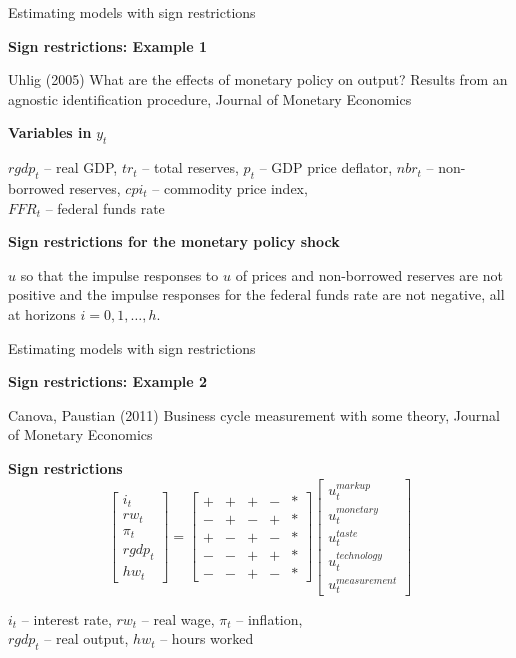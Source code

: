 \documentclass[notes,blackandwhite,mathsans,usenames,dvipsnames]{beamer}
\begin{document}
\begin{frame}{Estimating models with sign restrictions}

\textbf{Sign restrictions: Example 1}

\smallskip\footnotesize Uhlig (2005) {\color{mcxs2}What are the effects of monetary policy on output? Results from an agnostic identification procedure, Journal of Monetary Economics}

\bigskip\normalsize\textbf{Variables in} $y_t$

\smallskip 	$rgdp_t$ {\color{mcxs2}-- real GDP,} $tr_t$ {\color{mcxs2}-- total reserves,} $p_t$ {\color{mcxs2}-- GDP price deflator,} $nbr_t$ {\color{mcxs2}-- non-borrowed reserves,} $cpi_t$ {\color{mcxs2}-- commodity price index,}\\ $FFR_t$ {\color{mcxs2}-- federal funds rate}

\bigskip\normalsize\textbf{Sign restrictions for the monetary policy shock}

 $u$ {\color{mcxs2}so that the} {\color{purple}impulse responses} {\color{mcxs2}to} $u$ {\color{mcxs2}of} {\color{purple}prices and non-borrowed reserves are not positive} {\color{mcxs2}and the} {\color{purple}impulse responses for the federal funds rate are not negative}{\color{mcxs2}, all at horizons} $i=0,1,\dots,h$.

\end{frame}


\begin{frame}{Estimating models with sign restrictions}

\textbf{Sign restrictions: Example 2}

\smallskip\footnotesize Canova, Paustian (2011) {\color{mcxs2}Business cycle measurement with some theory, Journal of Monetary Economics}

\bigskip\normalsize\textbf{Sign restrictions}
$$
\begin{bmatrix} i_t \\ rw_t \\ \pi_t \\ rgdp_t \\ hw_t \end{bmatrix} = 
\begin{bmatrix}
+&+&+&-&*\\
-&+&-&+&*\\
+&-&+&-&*\\
-&-&+&+&*\\
-&-&+&-&*
 \end{bmatrix}
\begin{bmatrix}u_t^{markup} \\ u_t^{monetary} \\ u_t^{taste} \\ u_t^{technology} \\ u_t^{measurement}  \end{bmatrix}
$$

$i_t$ {\color{mcxs2}-- interest rate,} $rw_t$ {\color{mcxs2}-- real wage,} $\pi_t$ {\color{mcxs2}-- inflation,}\\ $rgdp_t$ {\color{mcxs2}-- real output,} $hw_t$ {\color{mcxs2}-- hours worked}
\end{frame}
\end{document}

